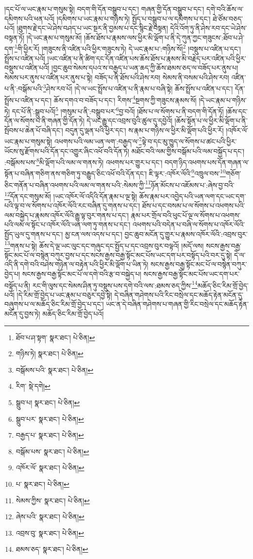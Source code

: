 །དང་པོ་ལ་ཡང་རྣམ་པ་གསུམ་སྟེ། བདག་གི་དོན་བསྒྲུབ་པ་དང་། གཞན་གྱི་དོན་བསྒྲུབ་པ་དང་། དགེ་བའི་ཆོས་ལ་དམིགས་པའི་ཕན་པའོ། །དམིགས་པ་ཡང་རྣམ་པ་གཉིས་ཏེ། སྤྱོད་པ་བསྒྲུབ་པ་ལ་དམིགས་པ་དང་། ཐེ་ཙོམ་བཅད་པའོ། །ཐུགས་རྗེ་དང་ཡེ་ཤེས་བཤད་པ་ཡང་སྔར་ནི་བྱམས་པ་དང་སྙིང་རྗེ་བསྟན། དེའི་འོག་ཏུ་ནི་ཤེས་རབ་དང་ཡེ་ཤེས་བསྟན་ཏོ། །དེ་ཡང་རྣམ་པ་གསུམ་མོ། །ཆོས་ཐོས་པ་རྣམས་ལས་ཕྱིར་མི་ལྡོག་པ་ནི་དེ་ཀུན་ཀྱང་གཟུངས་:ཐོབ་པ་ཤེ་དག་\footnote{ཐོབ་པ་ཤ་སྟག་  སྣར་ཐང་།  པེ་ཅིན། }གི་ཕྱིར་རོ། །གཟུངས་ནི་འཛིན་པའི་ཕྱིར་གཟུངས་ཏེ། དེ་ཡང་རྣམ་པ་:གཉིས་སོ།\footnote{གཉིས་ཏེ།  སྣར་ཐང་།  པེ་ཅིན། } །བསྡུས་པ་འཛིན་པ་དང་། སྤྲོས་པ་འཛིན་པའོ། །ཡང་འཛིན་པ་ནི་ཚིག་དང་དོན་འཛིན་པས་ཆོས་ཐོས་པ་རྣམས་མི་བརྗེད་པར་འཛིན་པའི་ཕྱིར་བསྡུས་པ་འཛིན་པའོ། །བྱང་ཆུབ་སེམས་དཔའ་ས་བརྒྱད་པ་ཡན་ཆད་ཀྱི་ཆོས་ཐམས་ཅད་ལ་བཟོད་པར་ནུས་པ། སེམས་པར་ནུས་པ་འཛིན་པར་ནུས་པ་སྟེ། བཟོད་པ་ནི་ཐོས་པའི་ཤེས་རབ། སེམས་ནི་བསམ་པའི་ཤེས་རབ། འཛིན་པ་ནི་:བསྒོམ་པའི་\footnote{བསྒོམས་པའི་  སྣར་ཐང་།  པེ་ཅིན། }ཤེས་རབ་པོ། །དེ་ལ་ཡང་སྤྲོས་པ་འཛིན་པ་ནི་རྣམ་པ་བཞི་སྟེ། ཆོས་སྤྲོས་པ་འཛིན་པ་དང་། དོན་སྤྲོས་པ་འཛིན་པ་དང་། ཆོས་དགའ་བ་བཟོད་པ་དང་། རིགས་\footnote{རིག་  སྡེ་དགེ། }སྔགས་ཀྱི་གཟུངས་རྣམས་སོ། །དེ་ཡང་རྣམ་པ་གཉིས་ཏེ། དང་པོ་ནི་:སྒྲུབ་པའོ།\footnote{སྒྲུབ་པ།  སྣར་ཐང་།  པེ་ཅིན། } །གསུམ་པ་ནི་:བསྒྲུབ་པར་\footnote{སྒྲུབ་པར་  སྣར་ཐང་།  པེ་ཅིན། }བྱ་བའོ། །ཐོས་པ་ལ་སོགས་པ་ནི་བདག་གི་དོན་ཏོ། །ཆོས་དང་དོན་ལ་སོགས་པ་ནི་གཞན་གྱི་དོན་ཏེ། དེ་ཡང་རྒྱུ་དང་འབྲས་བུའི་ཚུལ་དུ་དབྱེའོ། །ཆོས་སྟོན་པ་ལ་ཕྱིར་མི་ལྡོག་པ་ནི་སྤོབས་པ་ཆེན་པོ་བཞི་དང་། བདུན་དུ་ལྡན་པའི་ཕྱིར་དང་། ས་རྣམ་པ་གཉིས་ལ་ཕྱིར་མི་ལྡོག་པའི་ཕྱིར་རོ། །འཁོར་ལོ་ཡང་རྣམ་པ་གསུམ་སྟེ། འཕགས་པའི་ལམ་ཡན་ལག་:བརྒྱད་ལ་\footnote{བརྒྱད་པ་  སྣར་ཐང་།  པེ་ཅིན། }ལྟེ་བ་དང་མུ་ཁྱུད་ལ་སོགས་པ་ཚང་པའི་ཕྱིར་ཡོངས་སུ་རྫོགས་པའི་དོན་དང་འགྱུར་ཞིང་འཕོ་བའི་དོན་ཏེ། མཐོང་བའི་ལམ་གྱིས་བསྒོམ་པའི་ལམ་བསྐྱོད་པ་དང་། :བསྒོམས་པས་\footnote{བསྒོམ་པས་  སྣར་ཐང་།  པེ་ཅིན། }མི་ལྡོག་པའི་ལམ་ལ་གནས་ཏེ། འཕགས་པར་གྱུར་པ་དང་། བདག་ཉིད་འཕགས་པས་དོན་གཞན་ལ་སྟོན་པ་བཞིན་གཅིག་ནས་གཅིག་ཏུ་བརྒྱུད་ཅིང་འཕོ་བའི་དོན་དང་། ཇི་ལྟར་:འཁོར་ལོའི་\footnote{འཁོར་ལོ་  སྣར་ཐང་།  པེ་ཅིན། }འཁྲུལ་བས་\footnote{པ་  སྣར་ཐང་།  པེ་ཅིན། }གཅོག་ཅིང་གནོན་པ་བཞིན་འཕགས་པའི་ལམ་ལ་གནས་པའི་:སེམས་ཀྱི་\footnote{སེམས་ཀྱིས་  སྣར་ཐང་།  པེ་ཅིན། }ཉོན་མོངས་པ་འཇོམས་པ་:ཞེས་བྱ་བའི་\footnote{ཞེས་པའི་  སྣར་ཐང་།  པེ་ཅིན། }དོན་དང་གསུམ་མོ། །ཡང་འཁོར་ལོ་འདིའི་དོན་རྣམ་པ་ལྔ་སྟེ། ཆོས་རྣམ་པར་འབྱེད་པའི་ཡན་ལག་དང་ཡང་དག་པའི་ལྟ་བ་ལ་སོགས་པ་འཁོར་ལོའི་རང་བཞིན་དུ་གནས་པ་དང་། ཐོས་པ་དང་བསམ་པ་ལ་སོགས་པ་འཕགས་པའི་ལམ་བསྐྱེད་པ་རྣམས་འཁོར་ལོའི་རྒྱུ་ལྟ་བུར་གནས་པ་དང་། རྣམ་པར་གྲོལ་བའི་ཕུང་པོ་ལྔ་ལ་སོགས་པ་འཕགས་པའི་ལམ་ལ་སྟོང་པ་འཁོར་ལོའི་ཡན་ལག་ཏུ་གནས་པ་དང་། འཕགས་པའི་བདེན་པ་བཞི་ལ་སོགས་པ་འཁོར་ལོའི་སྤྱོད་ཡུལ་དུ་གནས་པ་དང་། མྱ་ངན་ལས་འདས་པ་དང་། བྱང་ཆུབ་མངོན་དུ་གྱུར་པ་རྣམས་འཁོར་ལོའི་:འབྲས་བུར་\footnote{འབྲས་བུ་  སྣར་ཐང་།  པེ་ཅིན། }གནས་པ་སྟེ། ཆོས་དེ་ལྔ་ཡང་ལུང་དང་གཞུང་དང་སྤྱོད་པ་དང་འབྲས་བུར་བལྟའོ། །མདོ་ལས། སངས་རྒྱས་བརྒྱ་སྟོང་མང་པོ་ལ་བསྙེན་བཀུར་བྱས་པ་དང་སངས་རྒྱས་བརྒྱ་སྟོང་མང་པོས་ཡང་དག་པར་བསྟོད་པའི་བར་དུ་སྟེ། དེ་ལ་འདི་ནི་དགེ་བའི་བཤེས་གཉེན་ལ་བརྟེན་པའི་ཕྱིར་མི་ལྡོག་པ་ཡིན་ཏེ། སངས་རྒྱས་བརྒྱ་སྟོང་མང་པོ་ལ་བསྙེན་བཀུར་བྱེད་པ། སངས་རྒྱས་བརྒྱ་སྟོང་མང་པོ་ལ་དགེ་བའི་རྩ་བ་བསྐྱེད་པ། སངས་རྒྱས་བརྒྱ་སྟོང་མང་པོས་ཡང་དག་པར་བསྟོད་པ་ནི། རང་གི་ལུས་དང་སེམས་ཤིན་ཏུ་བསྡུས་པས་དགེ་བའི་ལས་:ཐམས་ཅད་ཀྱིས་\footnote{ཐམས་ཅད་  སྣར་ཐང་།  པེ་ཅིན། }མཆོད་ཅིང་རིམ་གྲོ་བྱེད་པའོ། །དེ་རིམ་གྲོ་བྱེད་པ་ཡང་རྣམ་པ་བཅུར་དབྱེ་སྟེ། དེ་བཞིན་གཤེགས་པའི་རིང་བསྲེལ་དང་མཆོད་རྟེན་མངོན་དུ་བཞུགས་པ་ལ་མཆོད་ཅིང་རིམ་གྲོ་བྱེད་པ་དང་། ཡང་ན་དེ་བཞིན་གཤེགས་པ་གཞན་གྱི་རིང་བསྲེལ་དང་མཆོད་རྟེན་མངོན་དུ་བྱས་ཏེ། མཆོད་ཅིང་རིམ་གྲོ་བྱེད་པའོ། 